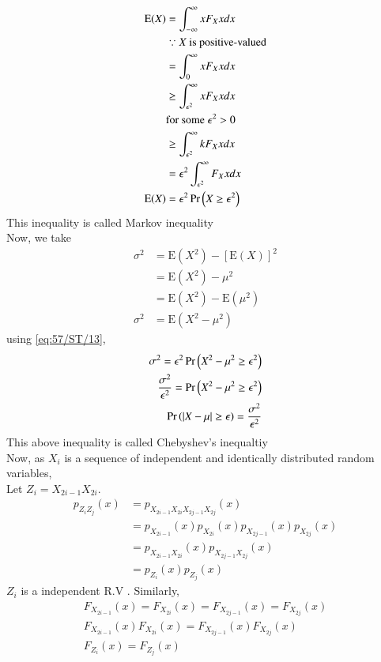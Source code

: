 \documentclass[journal,12pt,Twocolumn]{IEEEtran}
\theoremstyle{remark}
\begin{document}
\begin{align}
\text{E}(X)&=\int_{-\infty}^\infty xF_X{x}dx \\
&\because X \text{ is positive-valued} \\
&=\int_{0}^\infty xF_X{x}dx \\ 
&\geq \int_{\epsilon^2}^\infty xF_X{x}dx \\ 
&\text{for some } \epsilon^2 > 0 \\
&\geq \int_{\epsilon^2}^\infty kF_X{x}dx \\
&=\epsilon^2\int_{\epsilon^2}^\infty F_X{x}dx \\
\label{eq:57/ST/13}\text{E}(X)&=\epsilon^2\Pr\left(X\geq \epsilon^2\right) 
\end{align}
This inequality is called Markov inequality \\
Now, we take 
\begin{align}
\sigma^2 &= \text{E}(X^2) - [\text{E}(X)]^2 \\
&= \text{E}(X^2) - \mu^2 \\
&= \text{E}(X^2) - \text{E}(\mu^2) \\
\sigma^2 &= \text{E}(X^2-\mu^2)
\end{align}
using \eqref{eq:57/ST/13},
\begin{align}
\sigma^2 = \epsilon^2\Pr\left(X^2-\mu^2\geq \epsilon^2\right) \\
\frac{\sigma^2}{\epsilon^2} = \Pr\left(X^2-\mu^2\geq \epsilon^2\right) \\
\Pr\left(|X-\mu|\geq \epsilon\right) = \frac{\sigma^2}{\epsilon^2} 
\end{align}
This above inequality is called Chebyshev's inequaltiy \\
Now, as $X_i$ is a sequence of independent and identically distributed random variables, \\
Let $Z_i = X_{2i-1}X_{2i}$. \\ 
\begin{align}
p_{Z_iZ_j}(x)&=p_{X_{2i-1}X_{2i}X_{2j-1}X_{2j}}(x) \\ 
&= p_{X_{2i-1}}(x)p_{X_{2i}}(x)p_{X_{2j-1}}(x)p_{X_{2j}}(x) \\
&= p_{X_{2i-1}X_{2i}}(x)p_{X_{2j-1}X_{2j}}(x) \\
&= p_{Z_i}(x)p_{Z_j}(x)
\end{align}
$Z_i$ is a independent R.V . Similarly,
\begin{align}
F_{X_{2i-1}}(x) = F_{X_{2i}}(x) = F_{X_{2j-1}}(x) = F_{X_{2j}}(x) \\
F_{X_{2i-1}}(x)F_{X_{2i}}(x) = F_{X_{2j-1}}(x)F_{X_{2j}}(x) \\
F_{Z_i}(x) = F_{Z_j}(x)
\end{align}
\end{document}
